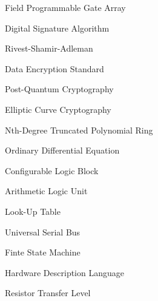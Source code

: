 \tableofcontents
\listoffigures

\begin{nomenclature}
\begin{description}
\item{} Field Programmable Gate Array

\item{} Digital Signature Algorithm

\item{} Rivest-Shamir-Adleman

\item{} Data Encryption Standard

\item{} Post-Quantum Cryptography

\item{} Elliptic Curve Cryptography

\item{} Nth-Degree Truncated Polynomial Ring

\item{} Ordinary Differential Equation

\item{} Configurable Logic Block

\item{} Arithmetic Logic Unit

\item{} Look-Up Table

\item{} Universal Serial Bus

\item{} Finte State Machine

\item{} Hardware Description Language

\item{} Resistor Transfer Level
\end{description}
\end{nomenclature}

\cleardoublepage{} %
